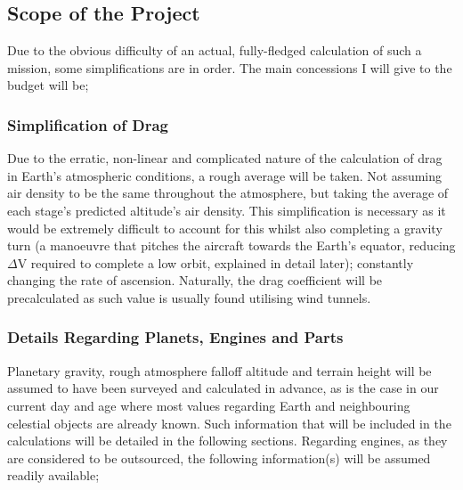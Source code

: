\documentclass[12pt]{article}
\begin{document}
    \pagebreak

    \subsection{Scope of the Project}

    Due to the obvious difficulty of an actual, fully-fledged calculation of such a mission, some simplifications are in order. The main concessions I will give to the budget will be;

    \subsubsection{Simplification of Drag}
    Due to the erratic, non-linear and complicated nature of the calculation of drag in Earth's atmospheric conditions, a rough average will be taken. Not assuming air density to be the same throughout the atmosphere, but taking the average of each stage's predicted altitude's air density. This simplification is necessary as it would be extremely difficult to account for this whilst also completing a gravity turn (a manoeuvre that pitches the aircraft towards the Earth's equator, reducing  \(\Delta \)V required to complete a low orbit, explained in detail later); constantly changing the rate of ascension. \newline
    Naturally, the drag coefficient will be precalculated as such value is usually found utilising wind tunnels. \newline
    \subsubsection{Details Regarding Planets, Engines and Parts}
    Planetary gravity, rough atmosphere falloff altitude and terrain height will be assumed to have been surveyed and calculated in advance, as is the case in our current day and age where most values regarding Earth and neighbouring celestial objects are already known. Such information that will be included in the calculations will be detailed in the following sections.\newline\newline
    Regarding engines, as they are considered to be outsourced, the following information(s) will be assumed readily available;
\end{document}
